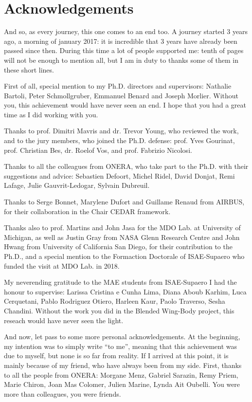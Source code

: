 \chapter*{Acknowledgements}

\mtcaddchapter  

And so, as every journey, this one comes to an end too. 
A journey started 3 years ago, a morning of january 2017: it is incredible that 3 years have already been passed since then. 
During this time a lot of people supported me: tenth of pages will not be enough to mention all, but I am in duty to thanks some of them in these short lines. 

First of all, special mention to my Ph.D. directors and supervisors: Nathalie Bartoli, Peter Schmollgruber, Emmanuel Benard and Joseph Morlier. 
Without you, this achievement would have never seen an end. 
I hope that you had a great time as I did working with you. 

Thanks to prof. Dimitri Mavris and dr. Trevor Young, who reviewed the work, and to the jury members, who joined the Ph.D. defense: prof. Yves Gourinat, prof. Christian Bes, dr. Roelof Vos, and prof. Fabrizio Nicolosi. 

Thanks to all the colleagues from ONERA, who take part to the Ph.D. with their suggestions and advice: Sebastien Defoort, Michel Ridel, David Donjat, Remi Lafage, Julie Gauvrit-Ledogar, Sylvain Dubreuil. 

Thanks to Serge Bonnet, Marylene Dufort and Guillame Renaud from AIRBUS, for their collaboration in the Chair CEDAR framework. 

Thanks also to prof. Martins and John Jasa for the MDO Lab. at University of Michigan, as well as Justin Gray from NASA Glenn Research Centre and John Hwang from University of California San Diego, for their contribution to the Ph.D., and a special mention to the Formaction Doctorale of ISAE-Supaero who funded the visit at MDO Lab. in 2018. 

My neverending gratitude to the MAE students from ISAE-Supaero I had the honour to supervise: Larissa Cristina e Cunha Lima, Diana Aboub Karhim, Luca Cerquetani, Pablo Rodriguez Otiero, Harleen Kaur, Paolo Traverso, Sesha Chandini. 
Without the work you did in the Blended Wing-Body project, this reseach would have never seen the light. 

And now, let pass to some more personal acknowledgements. 
At the beginning, my intention was to simply write ``to me'', meaning that this achievement was due to myself, but none is so far from reality. 
If I arrived at this point, it is mainly because of my friend, who have always been from my side. 
First, thanks to all the people from ONERA: Morgane Menz, Gabriel Sarazin, Remy Priem, Marie Chiron, Joan Mas Colomer, Julien Marine, Lynda Ait Oubelli. 
You were more than colleagues, you were friends.

